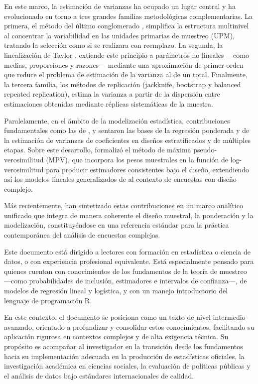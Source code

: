 \documentclass[
  spanish,
  12pt,
]{book}
\begin{document}
En este marco, la estimación de varianzas ha ocupado un lugar central y ha evolucionado en torno a tres grandes familias metodológicas complementarias. La primera, el método del último conglomerado \citep{hansen1953sample}, simplifica la estructura multinivel al concentrar la variabilidad en las unidades primarias de muestreo (UPM), tratando la selección como si se realizara con reemplazo. La segunda, la linealización de Taylor \citep{binder1983variances}, extiende este principio a parámetros no lineales ---como medias, proporciones y razones--- mediante una aproximación de primer orden que reduce el problema de estimación de la varianza al de un total. Finalmente, la tercera familia, los métodos de replicación (jackknife, bootstrap y balanced repeated replication), estima la varianza a partir de la dispersión entre estimaciones obtenidas mediante réplicas sistemáticas de la muestra.

Paralelamente, en el ámbito de la modelización estadística, contribuciones fundamentales como las de \citet{kish1974inference}, \citet{fuller1975regression} y \citet{binder1983variances} sentaron las bases de la regresión ponderada y de la estimación de varianzas de coeficientes en diseños estratificados y de múltiples etapas. Sobre este desarrollo, \citet{pfeffermann1993role} formalizó el método de máxima pseudo-verosimilitud (MPV), que incorpora los pesos muestrales en la función de log-verosimilitud para producir estimadores consistentes bajo el diseño, extendiendo así los modelos lineales generalizados de \citet{nelder1972generalized} al contexto de encuestas con diseño complejo.

Más recientemente, \citet{heeringa2017applied} han sintetizado estas contribuciones en un marco analítico unificado que integra de manera coherente el diseño muestral, la ponderación y la modelización, constituyéndose en una referencia estándar para la práctica contemporánea del análisis de encuestas complejas.

Este documento está dirigido a lectores con formación en estadística o ciencia de datos, o con experiencia profesional equivalente. Está especialmente pensado para quienes cuentan con conocimientos de los fundamentos de la teoría de muestreo ---como probabilidades de inclusión, estimadores e intervalos de confianza---, de modelos de regresión lineal y logística, y con un manejo introductorio del lenguaje de programación R.

En este contexto, el documento se posiciona como un texto de nivel intermedio-avanzado, orientado a profundizar y consolidar estos conocimientos, facilitando su aplicación rigurosa en contextos complejos y de alta exigencia técnica. Su propósito es acompañar al investigador en la transición desde los fundamentos hacia su implementación adecuada en la producción de estadísticas oficiales, la investigación académica en ciencias sociales, la evaluación de políticas públicas y el análisis de datos bajo estándares internacionales de calidad.
\end{document}
